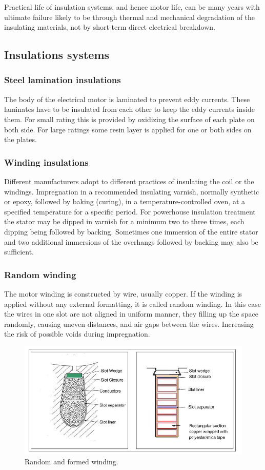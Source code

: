 Practical life of insulation systems, and hence motor life, can be many years with ultimate failure likely to be through thermal and mechanical degradation of the insulating materials, not by
short-term direct electrical breakdown.

\subsection{Insulations systems}
\subsubsection{Steel lamination insulations}
The body of the electrical motor is laminated to prevent eddy currents. These laminates have to be insulated from each other to keep the eddy currents inside them. For small rating this is provided by oxidizing the surface of each plate on both side. For large ratings some resin layer is applied for one or both sides on the plates.

\subsubsection{Winding insulations}

Different manufacturers adopt to different practices of insulating the coil or the windings. Impregnation in a recommended insulating varnish, normally synthetic or epoxy, followed by baking (curing), in a temperature-controlled oven, at a specified temperature for a specific period.
For powerhouse insulation treatment the stator may be dipped in varnish for a minimum two to three times, each dipping being followed by backing. Sometimes one immersion of the entire stator and
two additional immersions of the overhangs followed by backing may also be sufficient.

\subsubsection*{Random winding}

The motor winding is constructed by wire, usually copper. If the winding is applied without any external formatting, it is called random winding. In this case the wires in one slot are not aligned in uniform manner, they filling up the space randomly, causing uneven distances, and air gaps between the wires. Increasing the risk of possible voids during impregnation.

\begin{figure}[h]
 \centerline{\includegraphics[width=.85\columnwidth]{.//figures/random_vs_formed.png}}
 \caption{Random and formed winding.}
 \label{fig:rnd vs formed}
\end{figure}

